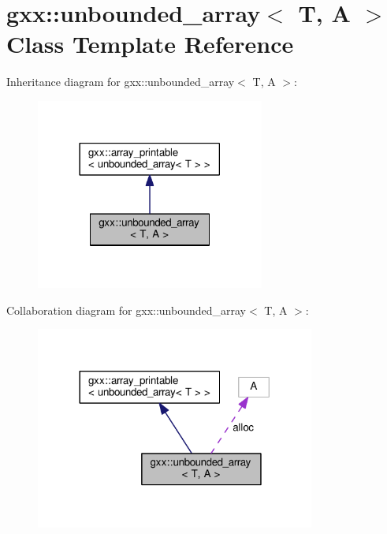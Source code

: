 \hypertarget{classgxx_1_1unbounded__array}{}\section{gxx\+:\+:unbounded\+\_\+array$<$ T, A $>$ Class Template Reference}
\label{classgxx_1_1unbounded__array}


Inheritance diagram for gxx\+:\+:unbounded\+\_\+array$<$ T, A $>$\+:
\nopagebreak
\begin{figure}[H]
\begin{center}
\leavevmode
\includegraphics[width=213pt]{classgxx_1_1unbounded__array__inherit__graph}
\end{center}
\end{figure}


Collaboration diagram for gxx\+:\+:unbounded\+\_\+array$<$ T, A $>$\+:
\nopagebreak
\begin{figure}[H]
\begin{center}
\leavevmode
\includegraphics[width=260pt]{classgxx_1_1unbounded__array__coll__graph}
\end{center}
\end{figure}
